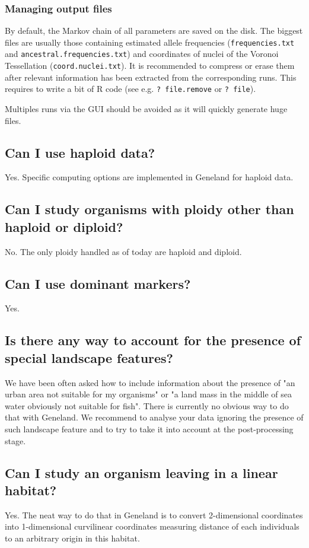 \documentclass[a4paper,10pt]{article}
\begin{document}
\subsubsection{Managing output files}
By default, the Markov chain of all parameters are saved on the disk. The biggest files are usually those containing estimated allele 
frequencies (\texttt{frequencies.txt} and \texttt{ancestral.frequencies.txt}) and coordinates of nuclei of the Voronoi Tessellation 
(\texttt{coord.nuclei.txt}). It is recommended to compress or erase them after relevant information has been extracted from 
the corresponding runs. This requires to write a bit of R code  (see e.g. {\tt ? file.remove} or {\tt ? file}).

Multiples runs via the GUI should be avoided as it will quickly generate huge files.


\subsection{Can I use haploid data?}
Yes. Specific computing options are implemented in {\sc Geneland} for haploid data. 

\subsection[Unusual ploidies]{Can I study organisms with ploidy other than haploid or diploid?}
No. The only ploidy handled as of today are haploid and diploid. 

\subsection{Can I use dominant markers?}
Yes. 

\subsection[Special landscape features]{Is there any way to account for the presence of special landscape features?}
We have been often asked how to include information about the presence of "an urban area not suitable for my organisms" 
or "a land mass in the middle of sea water obviously not suitable for fish". 
There is currently no obvious way to do that with {\sc Geneland}. 
We recommend to analyse your data ignoring the presence of such landscape feature and to  try to take it into account 
at the post-processing stage. 

\subsection[Linear habitat]{Can I study an organism leaving in a linear habitat?}
Yes. The neat way to do that in {\sc Geneland} is to convert 2-dimensional coordinates into 1-dimensional curvilinear coordinates measuring distance 
of each individuals to an arbitrary origin in this habitat.
\end{document}
